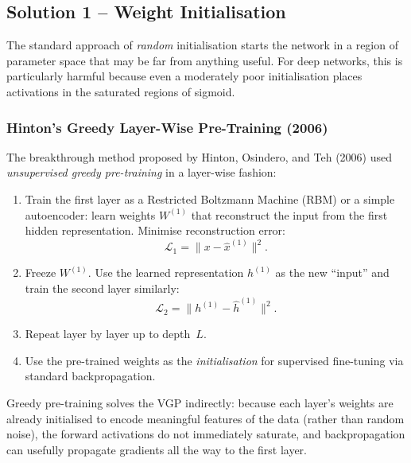 \documentclass[12pt,a4paper]{article}
\newcommand{\Loss}{\mathcal{L}}
\begin{document}
\subsection{Solution 1 -- Weight Initialisation}
\label{subsec:weight_init}

The standard approach of \emph{random} initialisation starts the
network in a region of parameter space that may be far from anything
useful.  For deep networks, this is particularly harmful because even a
moderately poor initialisation places activations in the saturated
regions of sigmoid.

\subsubsection{Hinton's Greedy Layer-Wise Pre-Training (2006)}
\label{subsubsec:greedy_pretrain}

The breakthrough method proposed by Hinton, Osindero, and Teh (2006)
used \emph{unsupervised greedy pre-training} in a layer-wise fashion:

\begin{enumerate}
  \item Train the first layer as a Restricted Boltzmann Machine (RBM)
        or a simple autoencoder: learn weights $W^{(1)}$ that
        reconstruct the input from the first hidden representation.
        Minimise reconstruction error:
        \begin{equation}
          \Loss_1 = \bigl\| x - \hat{x}^{(1)} \bigr\|^2.
          \label{eq:recon_loss_1}
        \end{equation}
  \item Freeze $W^{(1)}$.  Use the learned representation $h^{(1)}$
        as the new ``input'' and train the second layer similarly:
        \begin{equation}
          \Loss_2 = \bigl\| h^{(1)} - \hat{h}^{(1)} \bigr\|^2.
          \label{eq:recon_loss_2}
        \end{equation}
  \item Repeat layer by layer up to depth~$L$.
  \item Use the pre-trained weights as the \emph{initialisation} for
        supervised fine-tuning via standard backpropagation.
\end{enumerate}

\begin{keyinsight}
Greedy pre-training solves the VGP indirectly: because each layer's
weights are already initialised to encode meaningful features of the
data (rather than random noise), the forward activations do not
immediately saturate, and backpropagation can usefully propagate
gradients all the way to the first layer.
\end{keyinsight}
\end{document}
